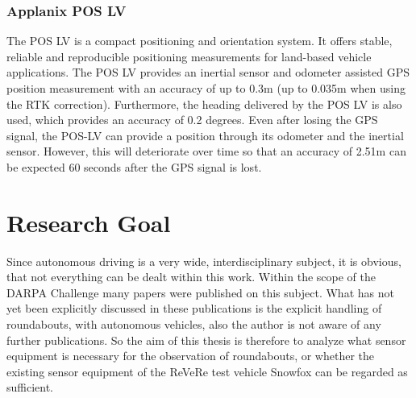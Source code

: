 \subsubsection{Applanix POS LV}
The POS LV is a compact positioning and orientation system. It offers stable, reliable and reproducible positioning measurements for land-based vehicle applications. The POS LV provides an inertial sensor and odometer assisted GPS position measurement with an accuracy of up to 0.3m (up to 0.035m when using the RTK correction).
Furthermore, the heading delivered by the POS LV is also used, which provides an accuracy of 0.2 degrees. Even after losing the GPS signal,
the POS-LV can provide a position through its odometer and the inertial sensor. However, this will deteriorate over time so that an accuracy of 2.51m
can be expected 60 seconds after the GPS signal is lost. \cite{manAP}


\section{Research Goal}
Since autonomous driving is a very wide, interdisciplinary subject, it is obvious, that not everything can be dealt within this work.
Within the scope of the \acs{DARPA} Challenge many papers were published on this subject. What has not yet been explicitly discussed in these publications
is the explicit handling of roundabouts, with autonomous vehicles, also the author is not aware of any further publications. 
So the aim of this thesis is therefore to analyze what sensor equipment is necessary for the observation of roundabouts,
or whether the existing sensor equipment of the ReVeRe test vehicle Snowfox can be regarded as sufficient.


